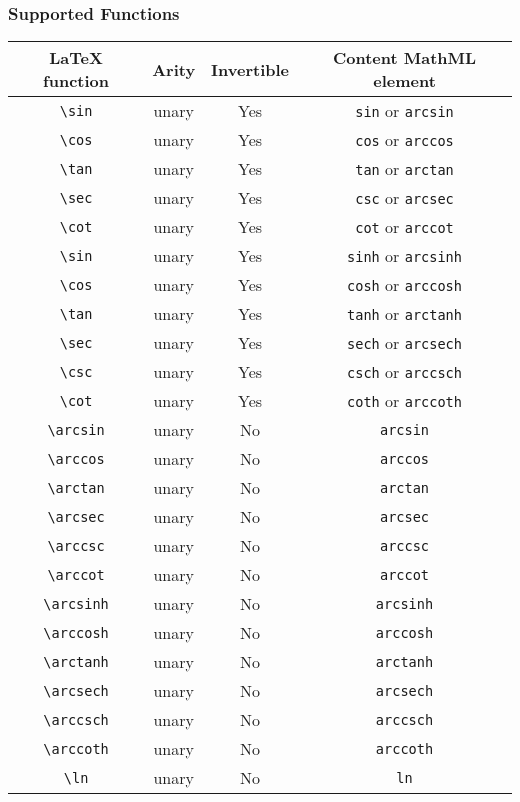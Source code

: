 \subsubsection*{Supported Functions}

\begin{tabular}{|c|c|c|c|}
\hline
LaTeX function & Arity & Invertible & Content MathML element \\
\hline
\verb|\sin| & unary & Yes & \verb|sin| or \verb|arcsin| \\
\verb|\cos| & unary & Yes & \verb|cos| or \verb|arccos| \\
\verb|\tan| & unary & Yes & \verb|tan| or \verb|arctan| \\
\verb|\sec| & unary & Yes & \verb|csc| or \verb|arcsec| \\
\verb|\cot| & unary & Yes & \verb|cot| or \verb|arccot| \\
\verb|\sin| & unary & Yes & \verb|sinh| or \verb|arcsinh| \\
\verb|\cos| & unary & Yes & \verb|cosh| or \verb|arccosh| \\
\verb|\tan| & unary & Yes & \verb|tanh| or \verb|arctanh| \\
\verb|\sec| & unary & Yes & \verb|sech| or \verb|arcsech| \\
\verb|\csc| & unary & Yes & \verb|csch| or \verb|arccsch| \\
\verb|\cot| & unary & Yes & \verb|coth| or \verb|arccoth| \\
\verb|\arcsin| & unary & No & \verb|arcsin| \\
\verb|\arccos| & unary & No & \verb|arccos| \\
\verb|\arctan| & unary & No & \verb|arctan| \\
\verb|\arcsec| & unary & No & \verb|arcsec| \\
\verb|\arccsc| & unary & No & \verb|arccsc| \\
\verb|\arccot| & unary & No & \verb|arccot| \\
\verb|\arcsinh| & unary & No & \verb|arcsinh| \\
\verb|\arccosh| & unary & No & \verb|arccosh| \\
\verb|\arctanh| & unary & No & \verb|arctanh| \\
\verb|\arcsech| & unary & No & \verb|arcsech| \\
\verb|\arccsch| & unary & No & \verb|arccsch| \\
\verb|\arccoth| & unary & No & \verb|arccoth| \\
\verb|\ln| & unary & No & \verb|ln| \\

\end{tabular}
